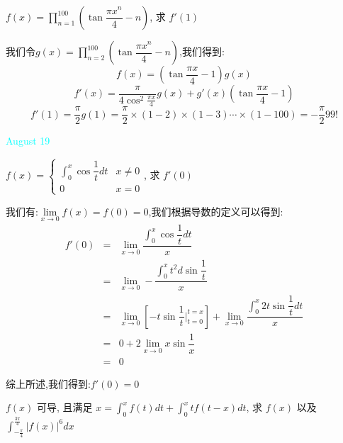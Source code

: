 \begin{example}[][Exam: 34.3.8]
	$f(x)=\prod\limits_{n=1}^{100}\left(\tan\dfrac{\pi x^n}{4}-n\right)$, 求 $f'(1)$
\end{example}

我们令$g(x)=\prod\limits_{n=2}^{100}\left(\tan\dfrac{\pi x^n}{4}-n\right)$,我们得到:$$f(x)=(\tan\dfrac{\pi x}{4}-1)g(x)$$
$$f'(x)=\dfrac{\pi}{4\cos^2\frac{\pi x}{4}}g(x)+g'(x)(\tan\dfrac{\pi x}{4}-1)$$
$$f'(1)=\dfrac{\pi}{2}g(1)=\dfrac{\pi}{2}\times(1-2)\times(1-3)\cdots\times(1-100)=-\dfrac{\pi}{2}99!$$


\textcolor{cyan}{August 19}

\begin{example}[][Exam: 34.3.9]
	$f(x)=\begin{cases}
		\int_{0}^{x}\cos\dfrac{1}{t}dt & x\neq 0\\
		0 & x=0
	\end{cases}$, 求 $f'(0)$
\end{example}

\begin{solution}

	我们有:$\lim\limits_{x\to 0}f(x)=f(0)=0$,我们根据导数的定义可以得到:  
	\begin{eqnarray*}
		f'(0)&=&\lim\limits_{x\to 0}\dfrac{\int_{0}^{x}\cos\dfrac{1}{t}dt}{x}\\
		&=&\lim\limits_{x\to 0}-\dfrac{\int_{0}^{x}t^2d\sin\dfrac{1}{t}}{x}\\
		&=&\lim\limits_{x\to 0}\left[ -t\sin\dfrac{1}{t}|_{t=0}^{t=x}\right]+\lim\limits_{x\to 0}\dfrac{\int_{0}^{x}2t\sin\dfrac{1}{t}dt}{x}\\
		&=&0+2\lim\limits_{x\to 0}x\sin\dfrac{1}{x}\\
		&=&0
	\end{eqnarray*}

	综上所述,我们得到:$f'(0)=0$
\end{solution}

\begin{example}[][Exam: 34.3.10]
	$f(x)$ 可导, 且满足 $x=\int_{0}^{x}f(t)dt+\int_{0}^{x}tf(t-x)dt$,
	求 $f(x)$ 以及 $\int_{-\frac{\pi}{4}}^{\frac{3\pi}{4}}\big|f(x)\big|^6dx$
\end{example}


